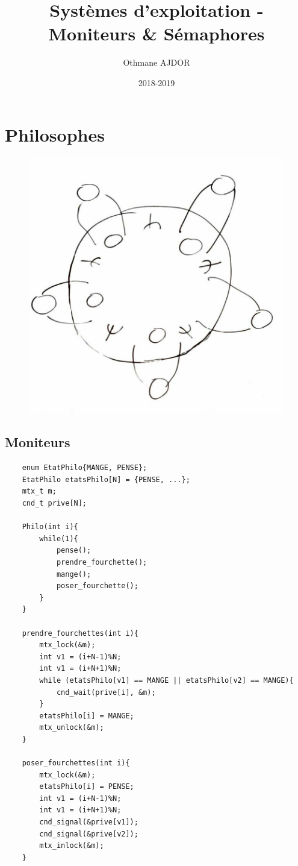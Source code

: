 \documentclass[11pt]{article}
\title{Systèmes d'exploitation - Moniteurs \& Sémaphores}
\author{Othmane AJDOR}
\date{2018-2019}
\begin{document}
\maketitle

\pagebreak
\tableofcontents
\pagebreak

\section{Philosophes}

\begin{figure}[h!]
    \centering
    \includegraphics[scale=0.2]{img/RB_0131.jpg}
\end{figure}

\subsection{Moniteurs}
\begin{verbatim}
    enum EtatPhilo{MANGE, PENSE};
    EtatPhilo etatsPhilo[N] = {PENSE, ...};
    mtx_t m;
    cnd_t prive[N];
    
    Philo(int i){
        while(1){
            pense();
            prendre_fourchette();
            mange();
            poser_fourchette();
        }
    }

    prendre_fourchettes(int i){
        mtx_lock(&m);
        int v1 = (i+N-1)%N;
        int v1 = (i+N+1)%N;
        while (etatsPhilo[v1] == MANGE || etatsPhilo[v2] == MANGE){
            cnd_wait(prive[i], &m);
        }
        etatsPhilo[i] = MANGE;
        mtx_unlock(&m);
    }

    poser_fourchettes(int i){
        mtx_lock(&m);
        etatsPhilo[i] = PENSE;
        int v1 = (i+N-1)%N;
        int v1 = (i+N+1)%N;
        cnd_signal(&prive[v1]);
        cnd_signal(&prive[v2]);
        mtx_inlock(&m);
    }
\end{verbatim}
\end{document}

